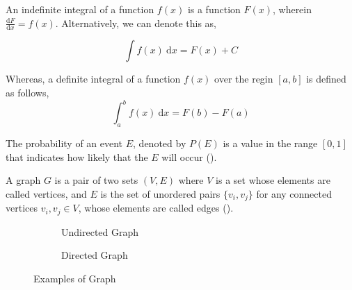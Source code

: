 An indefinite integral of a function $f(x)$ is a function $F(x)$, wherein $\frac{\text{d}F}{\text{d}x} = f(x)$. Alternatively, we can denote this as,

\begin{equation}
    \int f(x)~\text{d}x = F(x) + C
    \label{eq:integral}
\end{equation}

Whereas, a definite integral of a function $f(x)$ over the regin $[a,b]$ is defined as follows,
\begin{equation}
    \int_{a}^{b} f(x)~\text{d}x = F(b) - F(a)
    \label{eq:definite-integral}
\end{equation}

The probability of an event $E$, denoted by $P(E)$ is a value in the range $[0, 1]$ that indicates how likely that the $E$ will occur (\cite{probabilitydef}).


A graph $G$ is a pair of two sets $(V, E)$ where $V$ is a set whose elements are called vertices, and $E$ is the set of unordered pairs $\{v_i, v_j\}$ for any connected vertices $v_i, v_j \in V$, whose elements are called edges (\cite{diestel2024graph}).

\begin{figure}[htb]
    \centering
    \begin{subfigure}{0.4\textwidth}
        \centering
        \caption{Undirected Graph}
        \label{fig:undirected-graph}
    \end{subfigure}
    \qquad
    \begin{subfigure}{0.4\textwidth}
        \centering
        \caption{Directed Graph}
        \label{fig:directed-graph}
    \end{subfigure}
    \caption{Examples of Graph}
\end{figure}


